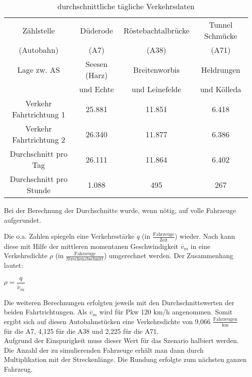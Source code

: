 \begin{table}[hptb]
\begin{center}
\setlength{\tabcolsep}{0.5em} %
{\renewcommand{\arraystretch}{1.2}%
\begin{tabular}{| c  c  c  c |}
\hline 
Zählstelle & Düderode & Röstebachtalbrücke & Tunnel Schmücke \\
(Autobahn) & (A7) & (A38) & (A71) \\
\hline 
Lage zw. AS & Seesen (Harz) & Breitenworbis & Heldrungen \\
 & und Echte & und Leinefelde & und Kölleda \\
\hline 
Verkehr Fahrtrichtung 1 & 25.881 & 11.851 & 6.418 \\ 
\hline 
Verkehr Fahrtrichtung 2 & 26.340 & 11.877 & 6.386 \\ 
\hline 
Durchschnitt pro Tag & 26.111 & 11.864 & 6.402 \\ 
\hline 
Durchschnitt pro Stunde & 1.088 & 495 & 267 \\ \hline
\end{tabular}
}
\caption{durchschnittliche tägliche Verkehrsdaten}
\label{tab:reale-verkehrsdaten}
\end{center}
\end{table}

\noindent
Bei der Berechnung der Durchschnitte wurde, wenn nötig, auf volle Fahrzeuge aufgerundet.

Die o.a. Zahlen spiegeln eine Verkehrsstärke $q$ (in $ \frac{\text{Fahrzeuge}}{\text{Zeit}} $) wieder.
Nach \cite{verkehrsplanung} kann diese mit Hilfe der mittleren momentanen Geschwindigkeit $\overline{v}_{m}$ in eine Verkehrsdichte $\rho$ (in $ \frac{\text{Fahrzeuge}}{\text{Streckenabschnitt}} $) umgerechnet werden.
Der Zusammenhang lautet: 
\begin{center}
$ \rho = \dfrac{q}{\overline{v}_{m}} $
\end{center}

Die weiteren Berechnungen erfolgten jeweils mit den Durchschnittswerten der beiden Fahrtrichtungen.
Als $\overline{v}_{m}$ wird für Pkw 120 km/h angenommen.
Somit ergibt sich auf diesen Autobahnstücken eine Verkehrsdichte von 9,066 $\frac{\text{Fahrzeugen}}{\text{km}}$ für die A7, 4,125 für die A38 und 2,225 für die A71.
\\
Aufgrund der Einspurigkeit muss dieser Wert für das Szenario halbiert werden. 
Die Anzahl der zu simulierenden Fahrzeuge erhält man dann durch Multiplikation mit der Streckenlänge.
Die Rundung erfolgte zum nächsten ganzen Fahrzeug.

